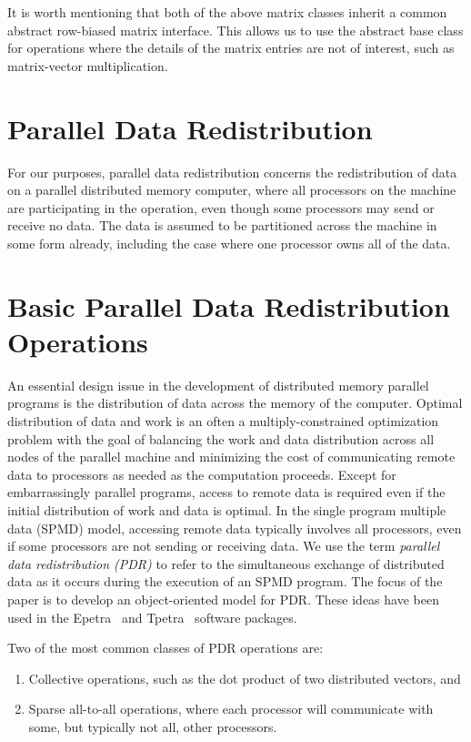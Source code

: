 \documentclass[12pt,relax]{PetraObjectModel}
\begin{document}
It is worth mentioning that both of the above matrix classes inherit 
a common abstract row-biased matrix interface.  This allows us to use the
abstract base class for operations where the details of the matrix entries
are not of interest, such as matrix-vector multiplication.



\section{Parallel Data Redistribution}
For our purposes, parallel data redistribution concerns the redistribution of 
data on a parallel distributed memory computer, where all processors on the 
machine are participating in the operation, even though some processors may
send or receive no data.  The data is assumed to be partitioned across the
machine in some form already, including the case where one processor owns all
of the data.


\section{Basic Parallel Data Redistribution Operations}

An essential design issue in the development of distributed memory parallel programs is the
distribution of data across the memory of the computer.  Optimal distribution of data and work
is an often a multiply-constrained optimization problem with the goal of balancing the work and
data distribution across all nodes of the parallel machine and minimizing the cost of
communicating remote data to processors as needed as the computation proceeds.
Except for embarrassingly parallel programs, access to remote data is required even if
the initial distribution of work and data is optimal.  In the single program multiple data
(SPMD) model, accessing remote data typically involves all processors, even if some processors
are not sending or receiving data.  We use the term {\it parallel data
redistribution (PDR)} to refer to the simultaneous exchange of distributed data as it occurs during
the execution of an SPMD program.  The focus of the paper is to develop an object-oriented
model for PDR.  These ideas have been used in the Epetra~\cite{Epetra-Ref-Manual} and
Tpetra~\cite{Tpetra-User-Guide} software packages.

Two of the most common classes of PDR operations are:
\begin{enumerate}
\item Collective operations, such as the dot
product of two distributed vectors, and 
\item Sparse all-to-all operations, where each processor will
communicate with some, but typically not all, other processors.
\end{enumerate}
\end{document}
